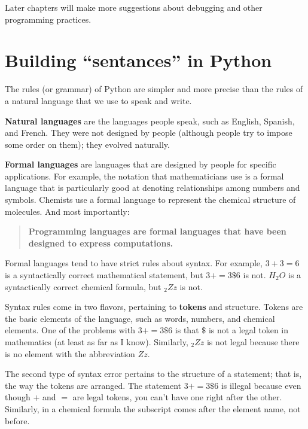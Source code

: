 \documentclass[10pt]{book}
\begin{document}
Later chapters will make more suggestions about debugging and other
programming practices.

\section{Building ``sentances'' in Python}

The rules (or grammar) of Python are simpler and more precise than 
the rules of a natural language that we use to speak and write.

{\bf Natural languages} are the languages people speak,
such as English, Spanish, and French.  They were not designed
by people (although people try to impose some order on them);
they evolved naturally.

{\bf Formal languages} are languages that are designed by people for
specific applications.  For example, the notation that mathematicians
use is a formal language that is particularly good at denoting
relationships among numbers and symbols.  Chemists use a formal
language to represent the chemical structure of molecules.  And
most importantly:

\begin{quote}
{\bf Programming languages are formal languages that have been
designed to express computations.}
\end{quote}

Formal languages tend to have strict rules about syntax.  For example,
$3 + 3 = 6$ is a syntactically correct mathematical statement, but 
$3 + = 3 \mbox{\$} 6$ is not.  $H_2O$ is a syntactically correct
chemical formula, but $_2Zz$ is not.

Syntax rules come in two flavors, pertaining to {\bf tokens} and
structure.  Tokens are the basic elements of the language, such as
words, numbers, and chemical elements.  One of the problems with $3 +
= 3 \mbox{\$} 6$ is that $\$$ is not a legal token in mathematics
(at least as far as I know).  Similarly, $_2Zz$ is not legal because
there is no element with the abbreviation $Zz$.


The second type of syntax error pertains to the structure of a
statement; that is, the way the tokens are arranged.  The statement $3
+ = 3 \mbox{\$} 6$ is illegal because even though $+$ and $=$ are
legal tokens, you can't have one right after the other.  Similarly,
in a chemical formula the subscript comes after the element name, not
before.
\end{document}
